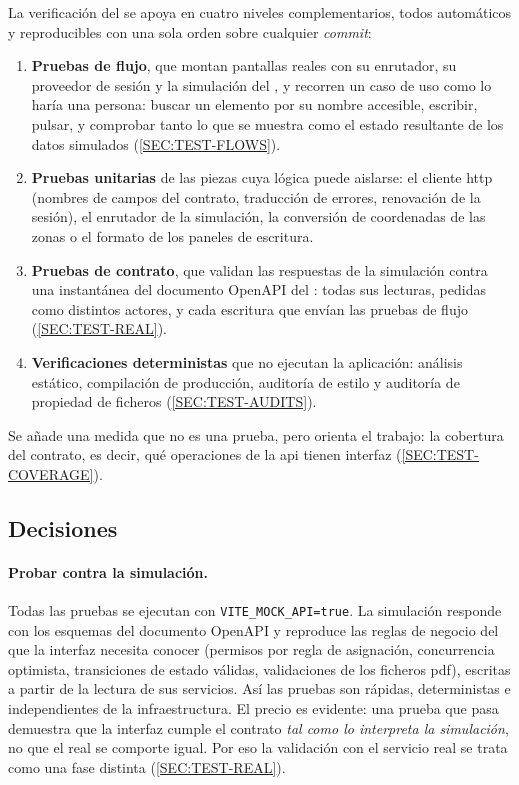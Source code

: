 La verificación del  se apoya en cuatro niveles complementarios, todos
automáticos y reproducibles con una sola orden sobre cualquier \textit{commit}:
\begin{enumerate}
  \item \textbf{Pruebas de flujo}, que montan pantallas reales con su enrutador, su
        proveedor de sesión y la simulación del , y recorren un caso de uso
        como lo haría una persona: buscar un elemento por su nombre accesible, escribir,
        pulsar, y comprobar tanto lo que se muestra como el estado resultante de los datos
        simulados (\cref{SEC:TEST-FLOWS}).
  \item \textbf{Pruebas unitarias} de las piezas cuya lógica puede aislarse: el cliente
        \acs{http} (nombres de campos del contrato, traducción de errores, renovación de la
        sesión), el enrutador de la simulación, la conversión de coordenadas de las zonas o
        el formato de los paneles de escritura.
  \item \textbf{Pruebas de contrato}, que validan las respuestas de la simulación contra
        una instantánea del documento OpenAPI del : todas sus lecturas, pedidas
        como distintos actores, y cada escritura que envían las pruebas de flujo
        (\cref{SEC:TEST-REAL}).
  \item \textbf{Verificaciones deterministas} que no ejecutan la aplicación: análisis
        estático, compilación de producción, auditoría de estilo y auditoría de propiedad de
        ficheros (\cref{SEC:TEST-AUDITS}).
\end{enumerate}

Se añade una medida que no es una prueba, pero orienta el trabajo: la cobertura del
contrato, es decir, qué operaciones de la \acs{api} tienen interfaz (\cref{SEC:TEST-COVERAGE}).

\subsection{Decisiones}

\paragraph{Probar contra la simulación.} Todas las pruebas se ejecutan con
\texttt{VITE\_MOCK\_API=true}. La simulación responde con los esquemas del documento OpenAPI
y reproduce las reglas de negocio del  que la interfaz necesita conocer
(permisos por regla de asignación, concurrencia optimista, transiciones de estado válidas,
validaciones de los ficheros \acs{pdf}), escritas a partir de la lectura de sus servicios. Así
las pruebas son rápidas, deterministas e independientes de la infraestructura. El precio
es evidente: una prueba que pasa demuestra que la interfaz cumple el contrato \emph{tal como
lo interpreta la simulación}, no que el  real se comporte igual. Por eso la
validación con el servicio real se trata como una fase distinta (\cref{SEC:TEST-REAL}).

